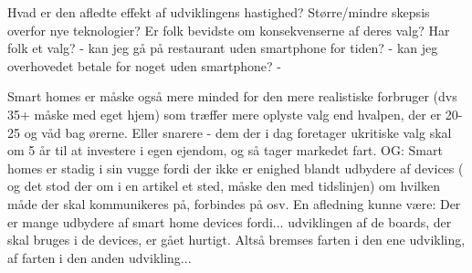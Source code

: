 \documentclass{article}
\begin{document}
Hvad er den afledte effekt af udviklingens hastighed?
Større/mindre skepsis overfor nye teknologier?
Er folk bevidste om konsekvenserne af deres valg?
Har folk et valg? 
- kan jeg gå på restaurant uden smartphone for tiden?
- kan jeg overhovedet betale for noget uden smartphone?
- 

Smart homes er måske også mere minded for den mere realistiske forbruger (dvs 35+ måske med eget hjem) som træffer mere oplyste valg end hvalpen, der er 20-25 og våd bag ørerne.
Eller snarere - dem der i dag foretager ukritiske valg skal om 5 år til at investere i egen ejendom, og så tager markedet fart.
OG: Smart homes er stadig i sin vugge fordi der ikke er enighed blandt udbydere af devices ( og det stod der om i en artikel et sted, måske den med tidslinjen) om hvilken måde der skal kommunikeres på, forbindes på osv. En afledning kunne være: Der er mange udbydere af smart home devices fordi... udviklingen af de boards, der skal bruges i de devices, er gået hurtigt. Altså bremses farten i den ene udvikling, af farten i den anden udvikling...
\end{document}
